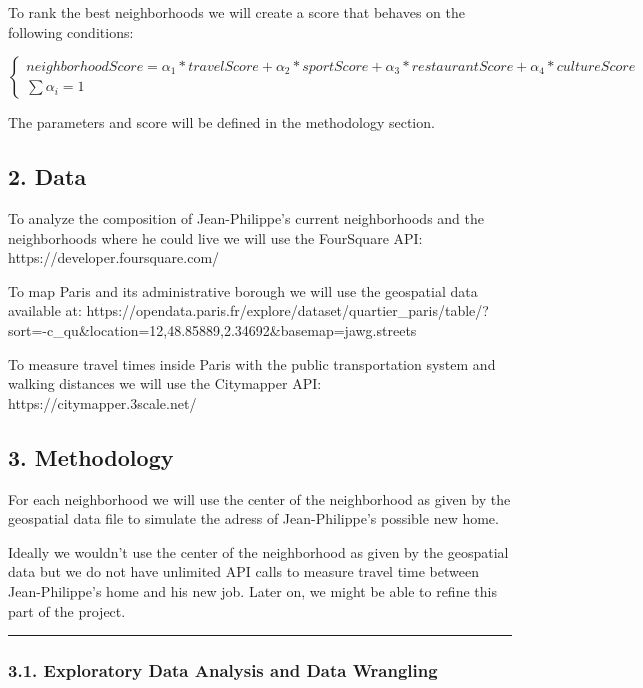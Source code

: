 \documentclass[11pt]{article}
\begin{document}
To rank the best neighborhoods we will create a score that behaves on
the following conditions:

\begin{equation}
\begin{cases}
neighborhoodScore = \alpha_1*travelScore + \alpha_2*sportScore + \alpha_3*restaurantScore + \alpha_4*cultureScore
\\ \sum \alpha_i =1
\end{cases}
\end{equation}

The parameters and score will be defined in the methodology section.

    \subsection{2. Data}\label{data}

To analyze the composition of Jean-Philippe's current neighborhoods and
the neighborhoods where he could live we will use the FourSquare API:
https://developer.foursquare.com/

To map Paris and its administrative borough we will use the geospatial
data available at:
https://opendata.paris.fr/explore/dataset/quartier\_paris/table/?sort=-c\_qu\&location=12,48.85889,2.34692\&basemap=jawg.streets

To measure travel times inside Paris with the public transportation
system and walking distances we will use the Citymapper API:
https://citymapper.3scale.net/

    \subsection{3. Methodology}\label{methodology}

For each neighborhood we will use the center of the neighborhood as
given by the geospatial data file to simulate the adress of
Jean-Philippe's possible new home.

Ideally we wouldn't use the center of the neighborhood as given by the
geospatial data but we do not have unlimited API calls to measure travel
time between Jean-Philippe's home and his new job. Later on, we might be
able to refine this part of the project.

    \begin{center}\rule{0.5\linewidth}{\linethickness}\end{center}

\subsubsection{3.1. Exploratory Data Analysis and Data
Wrangling}\label{exploratory-data-analysis-and-data-wrangling}
\end{document}
